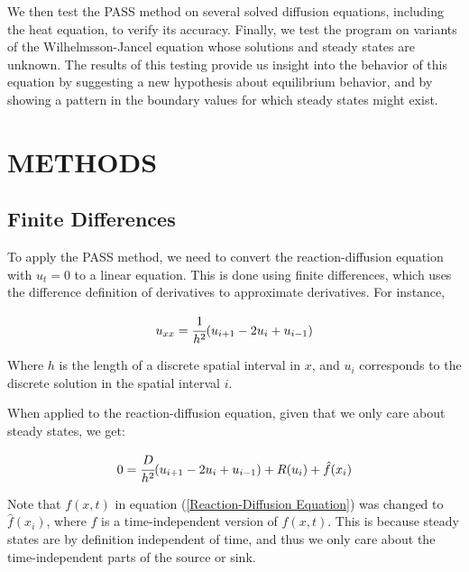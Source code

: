 \documentclass{article}
\begin{document}
We then test the PASS method on several solved diffusion equations, including the heat equation, to verify its accuracy. Finally, we test the program on variants of the Wilhelmsson-Jancel equation whose solutions and steady states are unknown. The results of this testing provide us insight into the behavior of this equation by suggesting a new hypothesis about equilibrium behavior, and by showing a pattern in the boundary values for which steady states might exist.

\section{METHODS}

\subsection{Finite Differences}

\begin{comment}
Introduce set theoretic variant of pixel array method. Uses (blank) as addition, (blank) as multiplication, gives full solutions instead of merely indicating the presence of a solution. Use the homogeneous heat equation as an example.
\end{comment}

To apply the PASS method, we need to convert the reaction-diffusion equation with $u_t = 0$ to a linear equation. This is done using finite differences, which uses the difference definition of derivatives to approximate derivatives. For instance,

\begin{equation}
    \label{FD second order}
    u_{xx} = \cfrac{1}{h^2} (u_{i+1} - 2u_i + u_{i-1})
\end{equation}

\noindent Where $h$ is the length of a discrete spatial interval in $x$, and $u_i$ corresponds to the discrete solution in the spatial interval $i$.

When applied to the reaction-diffusion equation, given that we only care about steady states, we get:

\begin{equation}
    \label{discrete RD}
    0 = \cfrac{D}{h^2} (u_{i+1} - 2u_i + u_{i-1}) + R(u_i) + \hat{f}(x_i)
\end{equation}

\noindent Note that $f(x,t)$ in equation (\ref{Reaction-Diffusion Equation}) was changed to $\hat{f}(x_i)$, where $\hat{f}$ is a time-independent version of $f(x,t)$. This is because steady states are by definition independent of time, and thus we only care about the time-independent parts of the source or sink. 
\end{document}
